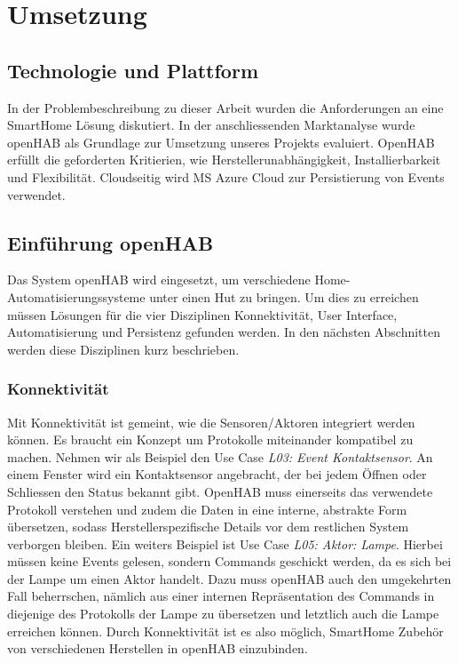 \section{Umsetzung}
\subsection{Technologie und Plattform}
In der Problembeschreibung zu dieser Arbeit wurden die Anforderungen an eine SmartHome Lösung diskutiert. In der anschliessenden Marktanalyse wurde openHAB als Grundlage zur Umsetzung unseres Projekts evaluiert. OpenHAB erfüllt die geforderten Kritierien, wie Herstellerunabhängigkeit, Installierbarkeit und Flexibilität. Cloudseitig wird MS Azure Cloud zur Persistierung von Events verwendet.

\subsection{Einführung openHAB}
Das System openHAB wird eingesetzt, um verschiedene Home-Automatisierungssysteme unter einen Hut zu bringen. Um dies zu erreichen müssen Lösungen für die vier Disziplinen Konnektivität, User Interface, Automatisierung und Persistenz gefunden werden. In den nächsten Abschnitten werden diese Disziplinen kurz beschrieben.

\subsubsection{Konnektivität}
Mit Konnektivität ist gemeint, wie die Sensoren/Aktoren integriert werden können. Es braucht ein Konzept um Protokolle miteinander kompatibel zu machen. Nehmen wir als Beispiel den Use Case \emph{L03: Event Kontaktsensor}. An einem Fenster wird ein Kontaktsensor angebracht, der bei jedem Öffnen oder Schliessen den Status bekannt gibt. OpenHAB muss einerseits das verwendete Protokoll verstehen und zudem die Daten in eine interne, abstrakte Form übersetzen, sodass Herstellerspezifische Details vor dem restlichen System verborgen bleiben. Ein weiters Beispiel ist Use Case \emph{L05: Aktor: Lampe}. Hierbei müssen keine Events gelesen, sondern Commands geschickt werden, da es sich bei der Lampe um einen Aktor handelt. Dazu muss openHAB auch den umgekehrten Fall beherrschen, nämlich aus einer internen Repräsentation des Commands in diejenige des Protokolls der Lampe zu übersetzen und letztlich auch die Lampe erreichen können. Durch Konnektivität ist es also möglich, SmartHome Zubehör von verschiedenen Herstellen in openHAB einzubinden. 

